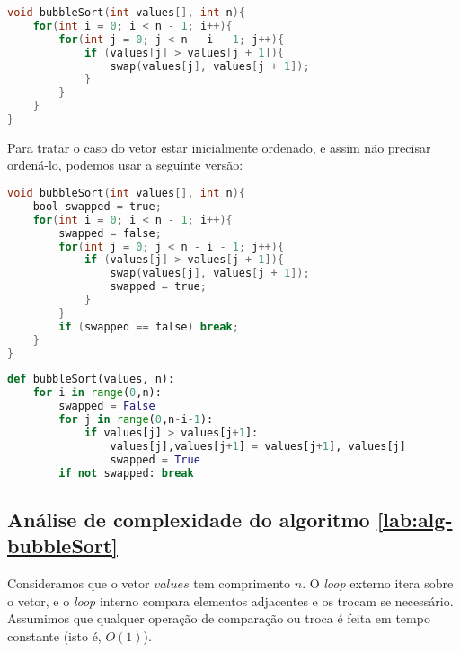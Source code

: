 \begin{lstlisting}[language=C,caption={Bubble sort em C},captionpos=t]
void bubbleSort(int values[], int n){
    for(int i = 0; i < n - 1; i++){
        for(int j = 0; j < n - i - 1; j++){
            if (values[j] > values[j + 1]){
                swap(values[j], values[j + 1]);
            }
        }
    }
}
\end{lstlisting}

Para tratar o caso do vetor estar inicialmente ordenado, e assim não precisar ordená-lo, podemos usar a seguinte versão: 
\begin{lstlisting}[language=C,caption={Bubble sort otimizado em C},captionpos=t]
void bubbleSort(int values[], int n){
    bool swapped = true;
    for(int i = 0; i < n - 1; i++){
        swapped = false;
        for(int j = 0; j < n - i - 1; j++){
            if (values[j] > values[j + 1]){
                swap(values[j], values[j + 1]);
                swapped = true;
            }
        }
        if (swapped == false) break;
    }
}
\end{lstlisting}

\begin{lstlisting}[language=Python,caption={Bubble sort otimizado em Python},captionpos=t]
def bubbleSort(values, n):
    for i in range(0,n):
        swapped = False  
        for j in range(0,n-i-1):
            if values[j] > values[j+1]:
                values[j],values[j+1] = values[j+1], values[j]
                swapped = True
        if not swapped: break
\end{lstlisting}


\subsection{Análise de complexidade do algoritmo \ref{lab:alg-bubbleSort}}

Consideramos que o vetor $values$ tem comprimento $n$.
O \textit{loop} externo itera sobre o vetor, e o \textit{loop} interno compara elementos adjacentes e os trocam se necessário. Assumimos que qualquer operação de comparação ou troca é feita em tempo constante (isto é, $O(1)$).

